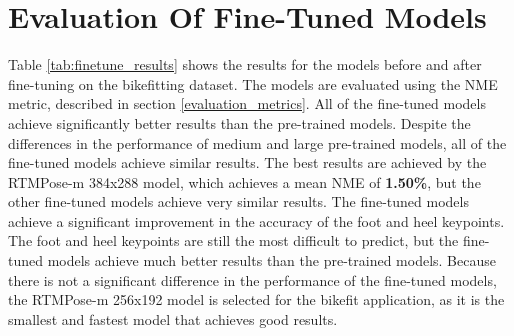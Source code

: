 \section{Evaluation Of Fine-Tuned Models}
\label{fine_tuning_results}
Table \ref{tab:finetune_results} shows the results for the models before and after fine-tuning on the bikefitting dataset. The models are evaluated using the NME metric, described in section \ref{evaluation_metrics}. All of the fine-tuned models achieve significantly better results than the pre-trained models. Despite the differences in the performance of medium and large pre-trained models, all of the fine-tuned models achieve similar results. The best results are achieved by the RTMPose-m 384x288 model, which achieves a mean NME of \textbf{1.50\%}, but the other fine-tuned models achieve very similar results. The fine-tuned models achieve a significant improvement in the accuracy of the foot and heel keypoints. The foot and heel keypoints are still the most difficult to predict, but the fine-tuned models achieve much better results than the pre-trained models. Because there is not a significant difference in the performance of the fine-tuned models, the RTMPose-m 256x192 model is selected for the bikefit application, as it is the smallest and fastest model that achieves good results.

\def\imgwidth{0.48\textwidth}
\def\smallimgwidth{1.0\textwidth}


